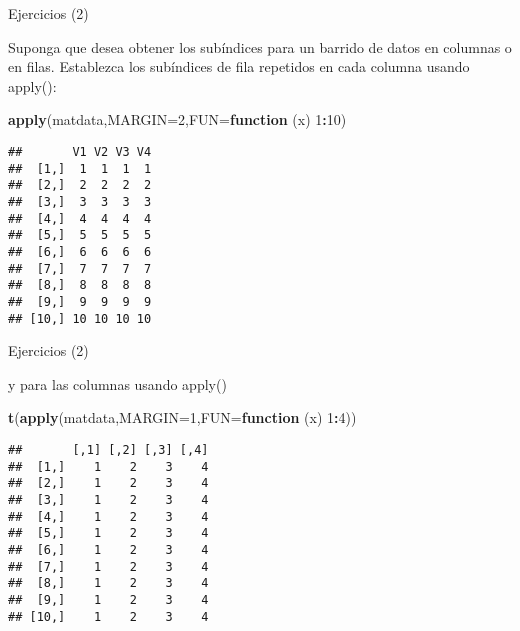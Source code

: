 \documentclass[ignorenonframetext,]{beamer}
\newenvironment{Shaded}{\begin{snugshade}}{\end{snugshade}}
\newcommand{\KeywordTok}[1]{\textcolor[rgb]{0.13,0.29,0.53}{\textbf{#1}}}
\newcommand{\DataTypeTok}[1]{\textcolor[rgb]{0.13,0.29,0.53}{#1}}
\newcommand{\DecValTok}[1]{\textcolor[rgb]{0.00,0.00,0.81}{#1}}
\newcommand{\ControlFlowTok}[1]{\textcolor[rgb]{0.13,0.29,0.53}{\textbf{#1}}}
\newcommand{\OperatorTok}[1]{\textcolor[rgb]{0.81,0.36,0.00}{\textbf{#1}}}
\newcommand{\NormalTok}[1]{#1}
\begin{document}
\begin{frame}[fragile]{Ejercicios (2)}

Suponga que desea obtener los subíndices para un barrido de datos en
columnas o en filas. Establezca los subíndices de fila repetidos en cada
columna usando apply():

\begin{Shaded}
\begin{Highlighting}[]
\KeywordTok{apply}\NormalTok{(matdata,}\DataTypeTok{MARGIN=}\DecValTok{2}\NormalTok{,}\DataTypeTok{FUN=}\ControlFlowTok{function}\NormalTok{ (x) }\DecValTok{1}\OperatorTok{:}\DecValTok{10}\NormalTok{)}
\end{Highlighting}
\end{Shaded}

\begin{verbatim}
##       V1 V2 V3 V4
##  [1,]  1  1  1  1
##  [2,]  2  2  2  2
##  [3,]  3  3  3  3
##  [4,]  4  4  4  4
##  [5,]  5  5  5  5
##  [6,]  6  6  6  6
##  [7,]  7  7  7  7
##  [8,]  8  8  8  8
##  [9,]  9  9  9  9
## [10,] 10 10 10 10
\end{verbatim}

\end{frame}

\begin{frame}[fragile]{Ejercicios (2)}

y para las columnas usando apply()

\begin{Shaded}
\begin{Highlighting}[]
\KeywordTok{t}\NormalTok{(}\KeywordTok{apply}\NormalTok{(matdata,}\DataTypeTok{MARGIN=}\DecValTok{1}\NormalTok{,}\DataTypeTok{FUN=}\ControlFlowTok{function}\NormalTok{ (x) }\DecValTok{1}\OperatorTok{:}\DecValTok{4}\NormalTok{))}
\end{Highlighting}
\end{Shaded}

\begin{verbatim}
##       [,1] [,2] [,3] [,4]
##  [1,]    1    2    3    4
##  [2,]    1    2    3    4
##  [3,]    1    2    3    4
##  [4,]    1    2    3    4
##  [5,]    1    2    3    4
##  [6,]    1    2    3    4
##  [7,]    1    2    3    4
##  [8,]    1    2    3    4
##  [9,]    1    2    3    4
## [10,]    1    2    3    4
\end{verbatim}

\end{frame}
\end{document}

